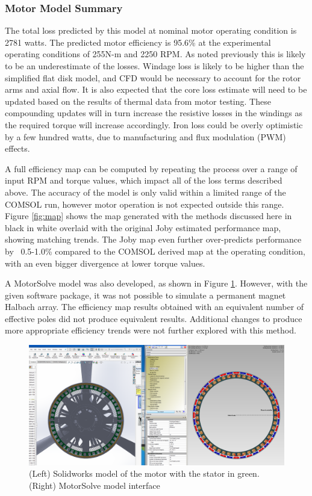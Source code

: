 \documentclass[]{aiaa-tc}%
\begin{document}
\subsubsection{Motor Model Summary}
The total loss predicted by this model at nominal motor operating condition is 2781 watts. The predicted motor efficiency is 95.6\% at the experimental operating conditions of 255N-m and 2250 RPM. As noted previously this is likely to be an underestimate of the losses. Windage loss is likely to be higher than the simplified flat disk model, and CFD would be necessary to account for the rotor arms and axial flow. It is also expected that the core loss estimate will need to be updated based on the results of thermal data from motor testing. These compounding updates will in turn increase the resistive losses in the windings as the required torque will increase accordingly. Iron loss could be overly optimistic by a few hundred watts, due to manufacturing and flux modulation (PWM) effects.

A full efficiency map can be computed by repeating the process over a range of input RPM and torque values, which impact all of the loss terms described above. The accuracy of the model is only valid within a limited range of the COMSOL run, however motor operation is not expected outside this range. Figure \ref{fig:map} shows the map generated with the methods discussed here in black in white overlaid with the original Joby estimated performance map\cite{Dubois2016}, showing matching trends. The Joby map even further over-predicts performance by ~0.5-1.0\% compared to the COMSOL derived map at the operating condition, with an even bigger divergence at lower torque values.

A MotorSolve model was also developed, as shown in Figure \ref{fig:motorSolve}. However, with the given software package, it was not possible to simulate a permanent magnet Halbach array. The efficiency map results obtained with an equivalent number of effective poles did not produce equivalent results. Additional changes to produce more appropriate efficiency trends were not further explored with this method.

\begin{figure}[!htb]%
	\centering
	\includegraphics[width=1.0\textwidth]{figures/motorSolve.png}
	\caption{(Left) Solidworks model of the motor with the stator in green. (Right) MotorSolve model interface}
	\label{fig:motorSolve}
\end{figure}
\end{document}
